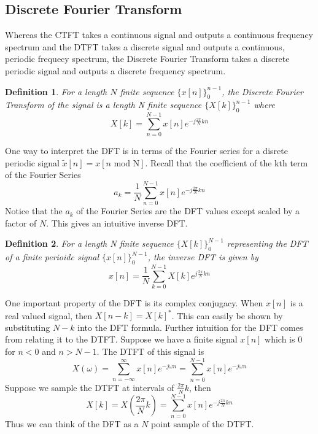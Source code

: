 \documentclass{article}
\newtheorem{definition}{Definition}
\begin{document}
\subsection{Discrete Fourier Transform}
Whereas the CTFT takes a continuous signal and outputs a continuous frequency spectrum and the DTFT takes a discrete signal
and outputs a continuous, periodic frequecy spectrum, the Discrete Fourier Transform takes a discrete periodic signal and outputs
a discrete frequency spectrum.
\begin{definition}
    For a length $N$ finite sequence $\{x[n]\}^{n-1}_{0}$, the Discrete Fourier Transform of the signal
    is a length N finite sequence $\{X[k]\}^{n-1}_{0}$ where
    $$X[k] = \sum_{n=0}^{N-1}{x[n]e^{-j\frac{2\pi}{N}kn}}$$
\end{definition}
One way to interpret the DFT is in terms of the Fourier series for a disrete periodic signal $\tilde{x}[n]=x[n\text{ mod N}]$. Recall that the coefficient of the kth term of the Fourier Series
$$a_k = \frac{1}{N}\sum_{n=0}^{N-1}{x[n]e^{-j\frac{2\pi}{N}kn}}$$
Notice that the $a_k$ of the Fourier Series are the DFT values except scaled by a factor of $N$. This gives an intuitive inverse DFT.
\begin{definition}
    For a length N finite sequence $\{X[k]\}^{N-1}_{0}$ representing the DFT of a finite perioidc signal $\{x[n]\}^{N-1}_{0}$,
    the inverse DFT is given by
    $$x[n] = \frac{1}{N}\sum_{k=0}^{N-1}{X[k]e^{j\frac{2\pi}{N}kn}}$$
\end{definition}
One important property of the DFT is its complex conjugacy. When $x[n]$ is a real valued signal,
then $X[n-k]=X[k]^*$. This can easily be shown by substituting $N-k$ into the DFT formula. Further intuition for the DFT
comes from relating it to the DTFT. Suppose we have a finite signal $x[n]$ which is $0$ for $n < 0$ and $n > N-1$.
The DTFT of this signal is
$$X(\omega) = \sum_{n=-\infty}^{\infty}{x[n]e^{-j\omega n}} = \sum_{n=0}^{N-1}{x[n]e^{-j\omega n}}$$
Suppose we sample the DTFT at intervals of $\frac{2\pi}{N}k$, then
$$X[k] = X\left(\frac{2\pi}{N}k\right) = \sum_{n=0}^{N-1}{x[n]e^{-j\frac{2\pi}{N}k n}}$$
Thus we can think of the DFT as a $N$ point sample of the DTFT.
\end{document}
